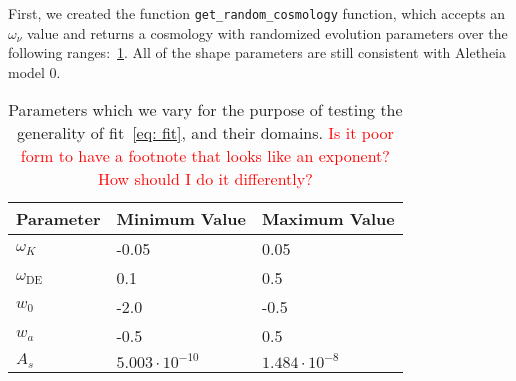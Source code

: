First, we created the function \verb|get_random_cosmology| function, which
accepts an $\omega_\nu$ value and returns a cosmology with randomized
evolution parameters over the following ranges:~\ref{tab: fit_test_params}.
All of the shape parameters are still consistent with Aletheia model 0.

\begin{table}[ht!]
\centering
\begin{tabular}{l|l|l}
\hline
Parameter & Minimum Value & Maximum Value \\ \hline
$\omega_K$ & -0.05 & 0.05 \\
$\omega_\text{DE}$\footnotemark & 0.1 & 0.5 \\
$w_0$ & -2.0 & -0.5 \\
$w_a$ & -0.5 & 0.5 \\
$A_s$\footnotemark & $5.003 \cdot 10^{-10}$ & $1.484 \cdot 10^{-8}$  \\
\end{tabular}
 \cprotect\caption[Parameter Ranges for Random Test
 	Cosmologies]{Parameters which we vary for the purpose of testing the
 	generality of fit~\ref{eq: fit}, and their domains.
 	\textcolor{red}{Is it poor form to have a footnote that looks like an
 	exponent? How should I do it differently?}}
 \label{tab: fit_test_params}
\end{table}

\addtocounter{footnote}{-1}


